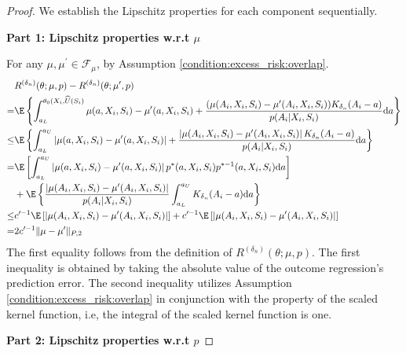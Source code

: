 \begin{proof}
\noindent We establish the Lipschitz properties for each component sequentially.

\noindent\textbf{Part 1: Lipschitz properties w.r.t $\mu$}

\noindent For any $\mu,\mu^\prime\in \mathcal{F}_{\mu}$, by Assumption \ref{condition:excess_risk:overlap}. 
\begin{align}
    &R^{({\delta_n})}(\theta;\mu, p) - R^{({\delta_n})}(\theta;\mu^\prime, p)\nonumber\\
     =  & \E\left\{\int_{a_L}^{\theta_0(X_i,\widehat U(S_i)}\mu(a,X_i,S_i) - \mu^\prime(a,X_i,S_i) + \frac{(\mu(A_i,X_i,S_i)- \mu^\prime(A_i,X_i,S_i))K_{\delta_n}(A_i-a)}{ p(A_{i}|X_{i},S_{i})}\mathrm{d}a\right\}\nonumber\\
     \leq  & \E\left\{\int_{a_L}^{a_U}\left|\mu(a,X_i,S_i) - \mu^\prime(a,X_i,S_i)\right| + \frac{\left|\mu(A_i,X_i,S_i)- \mu^\prime(A_i,X_i,S_i)\right|K_{\delta_n}(A_i-a)}{ p(A_{i}|X_{i},S_{i})}\mathrm{d}a\right\}\nonumber\\
     = & \E\left[\int_{a_L}^{a_U}\left|\mu(a,X_i,S_i) - \mu^\prime(a,X_i,S_i)\right|p^*(a,X_i,S_i)p^{*-1}(a,X_i,S_i)\mathrm{d}a\right]\nonumber\\
     & + \E\left\{\frac{\left|\mu(A_i,X_i,S_i)- \mu^\prime(A_i,X_i,S_i)\right|}{ p(A_{i}|X_{i},S_{i})}\int_{a_L}^{a_U}K_{\delta_n}(A_i-a)\mathrm{d}a\right\}\nonumber\\
     \leq &c^{\prime-1}\E\left[|\mu(A_i,X_i,S_i)-\mu^\prime(A_i,X_i,S_i)|\right] + c^{\prime-1}\E\left[|\mu(A_i,X_i,S_i)-\mu^\prime(A_i,X_i,S_i)|\right]\nonumber\\
     = & 2c^{\prime-1}\|\mu-\mu^\prime\|_{P,2}\label{eq:lipschitz_to_mu_E}
\end{align}
The first equality follows from the definition of $R^{({\delta_n})}(\theta;\mu, p)$. The first inequality is obtained by taking the absolute value of the outcome regression's prediction error. The second inequality utilizes Assumption \ref{condition:excess_risk:overlap} in conjunction with the property of the scaled kernel function, i.e, the integral of the scaled kernel function is one.


\noindent \textbf{Part 2: Lipschitz properties w.r.t $p$}


\end{proof}
